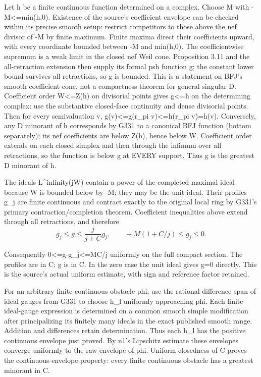 \documentclass[11pt]{article}
\begin{document}
Let h be a finite continuous function determined on a complex. Choose M with -M<=min(h,0). Existence of the source's coefficient envelope can be checked within its precise smooth setup: restrict competitors to those above the nef divisor of -M by finite maximum. Finite maxima direct their coefficients upward, with every coordinate bounded between -M and min(h,0). The coefficientwise supremum is a weak limit in the closed nef Weil cone. Proposition 3.11 and the all-retraction extension then supply its formal psh function g; the constant lower bound survives all retractions, so g is bounded. This is a statement on BFJ's smooth coefficient cone, not a compactness theorem for general singular D. Coefficient order W<=Z(h) on divisorial points gives g<=h on the determining complex: use the substantive closed-face continuity and dense divisorial points. Then for every semivaluation v, g(v)<=g(r\_pi v)<=h(r\_pi v)=h(v). Conversely, any D minorant of h corresponds by G331 to a canonical BFJ function (bottom separately); its nef coefficients are below Z(h), hence below W. Coefficient order extends on each closed simplex and then through the infimum over all retractions, so the function is below g at EVERY support. Thus g is the greatest D minorant of h.

The ideals L\textasciicircum{}infinity(jW) contain a power of the completed maximal ideal because W is bounded below by -M; they may be the unit ideal. Their profiles g\_j are finite continuous and contract exactly to the original local ring by G331's primary contraction/completion theorem. Coefficient inequalities above extend through all retractions, and therefore
\[
g_j\le g\le \frac{j}{j+C}g_j,\qquad
-M(1+C/j)\le g_j\le0.
\]

Consequently 0<=g-g\_j<=MC/j uniformly on the full compact section. The profiles are in C; g is in C. In the zero case the unit ideal gives g=0 directly. This is the source's actual uniform estimate, with sign and reference factor retained.

For an arbitrary finite continuous obstacle phi, use the rational difference span of ideal gauges from G331 to choose h\_l uniformly approaching phi. Each finite ideal-gauge expression is determined on a common smooth simple modification after principalizing its finitely many ideals in the exact published smooth range. Addition and differences retain determination. Thus each h\_l has the positive continuous envelope just proved. By n1's Lipschitz estimate these envelopes converge uniformly to the raw envelope of phi. Uniform closedness of C proves the continuous-envelope property: every finite continuous obstacle has a greatest minorant in C.
\end{document}

